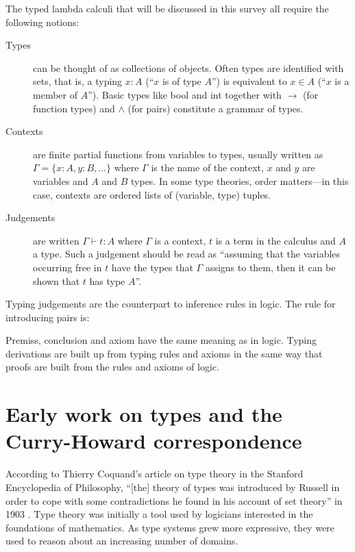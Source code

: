 \documentclass[12pt,toc=bibliography,numbers=noendperiod,
               footnotes=multiple,twoside]{scrartcl}
\begin{document}

The typed lambda calculi that will be discussed in this survey all require the following notions:

\begin{description}
\item[Types] can be thought of as collections of objects. Often types are identified with sets, that is, a typing \(x:A\) (\enquote{\(x\) is of type \(A\)}) is equivalent to \(x \in A\) (\enquote{\(x\) is a member of \(A\)}). Basic types like bool and int together with \(\rightarrow\) (for function types) and \(\wedge\) (for pairs) constitute a grammar of types.
\item[Contexts] are finite partial functions from variables to types, usually written as \(\Gamma = \{x:A,y:B,\dots\}\) where \(\Gamma\) is the name of the context, \(x\) and \(y\) are variables and \(A\) and \(B\) types. In some type theories, order matters---in this case, contexts are ordered lists of (variable, type) tuples.
\item[Judgements] are written \(\Gamma \vdash t:A\) where \(\Gamma\) is a context, \(t\) is a term in the calculus and \(A\) a type. Such a judgement should be read as \enquote{assuming that the variables occurring free in \(t\) have the types that \(\Gamma\) assigns to them, then it can be shown that \(t\) has type \(A\)}.
\end{description}

Typing judgements are the counterpart to inference rules in logic. The rule for introducing pairs is:

\begin{figure}[h]
\begin{prooftree}
\end{prooftree}
\end{figure}

Premiss, conclusion and axiom have the same meaning as in logic. Typing derivations are built up from typing rules and axioms in the same way that proofs are built from the rules and axioms of logic.

\section{Early work on types and the Curry-Howard correspondence}

According to Thierry Coquand's article on type theory in the Stanford Encyclopedia of Philosophy, \enquote{[the] theory of types was introduced by Russell in order to cope with some contradictions he found in his account of set theory} in 1903 \autocite{coquand_type_2014}. Type theory was initially a tool used by logicians interested in the foundations of mathematics. As type systems grew more expressive, they were used to reason about an increasing number of domains.
\end{document}
